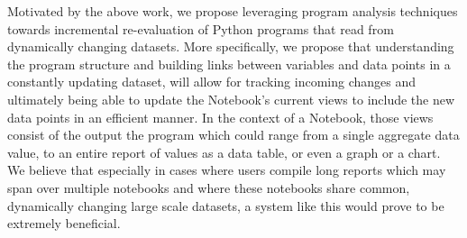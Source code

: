 \documentclass[11pt,letterpaper]{article}
\begin{document}
Motivated by the above work, we propose leveraging program analysis techniques towards incremental re-evaluation of Python programs that read from dynamically changing datasets. More specifically, we propose that understanding the program structure and building links between variables and data points in a constantly updating dataset, will allow for tracking incoming changes and ultimately being able to update the Notebook's current views to include the new data points in an efficient manner. In the context of a Notebook, those views consist of the output the program which could range from a single aggregate data value, to an entire report of values as a data table, or even a graph or a chart. We believe that especially in cases where users compile long reports which may span over multiple notebooks and where these notebooks share common, dynamically changing large scale datasets, a system like this would prove to be extremely beneficial.



\end{document}
